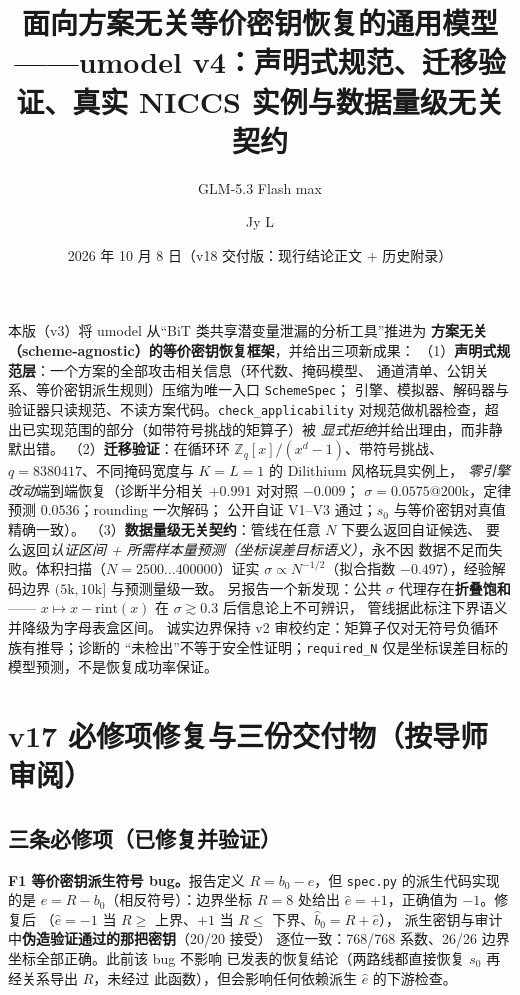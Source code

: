 \documentclass[11pt,a4paper]{ctexart}
\title{\bfseries 面向方案无关等价密钥恢复的通用模型\\[0.3em]
\large ——umodel v4：声明式规范、迁移验证、真实 NICCS 实例与数据量级无关契约}
\author{GLM-5.3 Flash max \and Jy L}
\date{2026 年 10 月 8 日（v18 交付版：现行结论正文 + 历史附录）}
\begin{document}
\maketitle

\begin{keybox}[摘要]
本版（v3）将 umodel 从``BiT 类共享潜变量泄漏的分析工具''推进为
\textbf{方案无关（scheme-agnostic）的等价密钥恢复框架}，并给出三项新成果：
（1）\textbf{声明式规范层}：一个方案的全部攻击相关信息（环代数、掩码模型、
通道清单、公钥关系、等价密钥派生规则）压缩为唯一入口 \texttt{SchemeSpec}；
引擎、模拟器、解码器与验证器只读规范、不读方案代码。\texttt{check\_applicability}
对规范做机器检查，超出已实现范围的部分（如带符号挑战的矩算子）被
\emph{显式拒绝}并给出理由，而非静默出错。
（2）\textbf{迁移验证}：在循环环 $\mathbb{Z}_q[x]/(x^d-1)$、带符号挑战、
$q=8380417$、不同掩码宽度与 $K{=}L{=}1$ 的 Dilithium 风格玩具实例上，
\emph{零引擎改动}端到端恢复（诊断半分相关 $+0.991$ 对对照 $-0.009$；
$\sigma=0.0575$@$200$k，定律预测 $0.0536$；rounding 一次解码；
公开自证 V1--V3 通过；$s_0$ 与等价密钥对真值精确一致）。
（3）\textbf{数据量级无关契约}：管线在任意 $N$ 下要么返回自证候选、
要么返回\emph{认证区间 + 所需样本量预测（坐标误差目标语义）}，永不因
数据不足而失败。体积扫描（$N=2500\ldots400000$）证实
$\sigma\propto N^{-1/2}$（拟合指数 $-0.497$），经验解码边界
$(5\mathrm{k},10\mathrm{k}]$ 与预测量级一致。
另报告一个新发现：公共 $\sigma$ 代理存在\textbf{折叠饱和}——
$x\mapsto x-\mathrm{rint}(x)$ 在 $\sigma\gtrsim0.3$ 后信息论上不可辨识，
管线据此标注下界语义并降级为字母表盒区间。
诚实边界保持 v2 审校约定：矩算子仅对无符号负循环族有推导；诊断的
``未检出''不等于安全性证明；\texttt{required\_N} 仅是坐标误差目标的
模型预测，不是恢复成功率保证。
\end{keybox}

\tableofcontents

\section{v17 必修项修复与三份交付物（按导师审阅）}

\subsection{三条必修项（已修复并验证）}

\textbf{F1 等价密钥派生符号 bug。}报告定义 $R=b_0-e$，但
\texttt{spec.py} 的派生代码实现的是 $e=R-b_0$（相反符号）：边界坐标
$R=8$ 处给出 $\hat e=+1$，正确值为 $-1$。修复后
（$\hat e=-1$ 当 $R\ge$ 上界、$+1$ 当 $R\le$ 下界、$\hat b_0=R+\hat e$），
派生密钥与审计中\textbf{伪造验证通过的那把密钥}（20/20 接受）
逐位一致：768/768 系数、26/26 边界坐标全部正确。此前该 bug 不影响
已发表的恢复结论（两路线都直接恢复 $s_0$ 再经关系导出 $R$，未经过
此函数），但会影响任何依赖派生 $\hat e$ 的下游检查。
\end{document}
